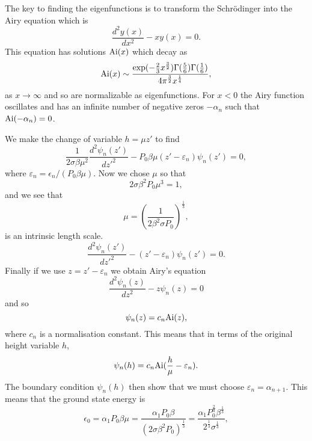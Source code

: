 The key to finding the eigenfunctions is to transform  the Schr\"odinger into the Airy equation which is
\begin{equation}
    \frac{d^2y(x)}{dx^2}- x y(x)=0.
\end{equation}
This equation has solutions ${\rm Ai}(x)$ which decay as 
\begin{equation}
    {\rm Ai}(x) \sim \frac{\exp(-\frac{2}{3} x^{\frac{3}{2}}) \Gamma(\frac{5}{6})\Gamma(\frac{1}{6})}{4\pi^{\frac{3}{2}} x^{\frac{1}{4}}},
\end{equation}
as $x\to\infty$ and so are normalizable as eigenfunctions. For $x<0$ the Airy function  oscillates and has an 
infinite number of negative zeros $-\alpha_n$ such that ${\rm Ai}(-\alpha_n)=0$. 

We make the change of variable $h=\mu z'$ to find
\begin{equation}
    \frac{1}{2\sigma\beta\mu^2}\frac{d^2 \psi_n(z')}{dz'^2}- P_0\beta \mu(z'-\varepsilon_n)\psi_n(z')=0,
\end{equation}
where $\varepsilon_n= \epsilon_n/(P_0\beta\mu)$. Now  we chose $\mu$ so that
\begin{equation}
    2\sigma\beta^2P_0 \mu^3=1,
\end{equation}
and we see that  
\begin{equation}
    \mu = \left(\frac{1}{2\beta^2\sigma P_0}\right)^{\frac{1}{3}},
\end{equation}
is an intrinsic length scale.
\begin{equation}
    \frac{d^2 \psi_n(z')}{dz'^2}- (z'-\varepsilon_n)\psi_n(z')=0.
\end{equation}
Finally if we use $z=z'-\varepsilon_n$ we obtain Airy's equation
\begin{equation}
    \frac{d^2 \psi_n(z)}{dz^2}- z\psi_n(z)=0
\end{equation}
and so
\begin{equation}
    \psi_n(z)= c_n {\rm Ai}(z),
\end{equation}
where $c_n$ is a normalisation constant. This means that in terms of the original height variable $h$, 
\begin{equation}
    \psi_n(h)= c_n {\rm Ai}(\frac{h}{\mu}-\varepsilon_n).
\end{equation}
The boundary condition $\psi_n(h)$ then show that we must choose $\varepsilon_n=\alpha_{n+1}$. This means that the ground state energy is
\begin{equation}
    \epsilon_0 = \alpha_1P_0\beta\mu= \frac{\alpha_1P_0\beta}{(2\sigma\beta^2P_0)^\frac{1}{3}}= \frac{\alpha_1 P_0^\frac{2}{3}\beta^\frac{1}{3}}{2^\frac{1}{3} \sigma^\frac{1}{3}},
\end{equation}
